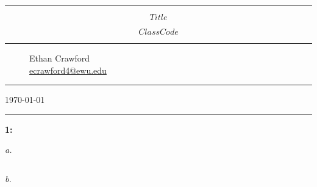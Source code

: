 \documentclass[]{article}
\begin{document}
\begin{titlepage}
    \centering

    \vspace*{1cm}

    \rule{.7\textwidth}{1pt}

    \vspace{.7\baselineskip}
    {\huge \textbf{\[ Title \]}}

    \vspace*{.5cm}
    {\Large \[ Class Code \]}
    
    \rule{.7\textwidth}{1pt}

    \vspace{1cm}

    \large

    \begin{figure}[!ht]
        \large
        \centering
        Ethan Crawford \\
        {\normalsize \url{ecrawford4@ewu.edu}}
    \end{figure}


    \vspace{3cm}


    \vfill

    \rule{.7\textwidth}{1pt}

    \vspace*{.25cm}

    \Large \today

    \rule{.7\textwidth}{1pt}

\end{titlepage}

\noindent\textbf{1:}

\vspace{5mm}\textit{a.}

\begin{lstlisting}
\end{lstlisting}

\vspace{5mm}\textit{b.}
\end{document}
